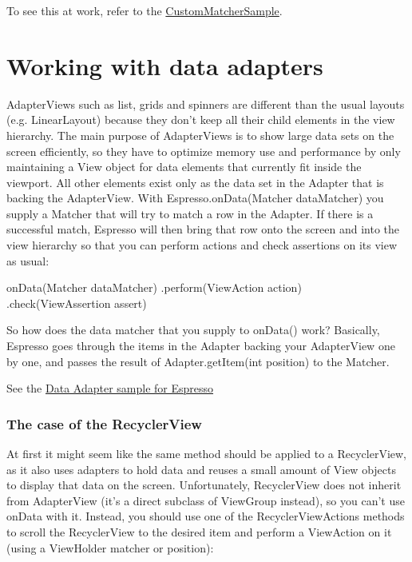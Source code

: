 To see this at work, refer to the \href{https://github.com/googlesamples/android-testing/tree/master/ui/espresso/CustomMatcherSample}{CustomMatcherSample}.

\section{Working with data adapters}
AdapterViews such as list, grids and spinners are different than the usual layouts (e.g. LinearLayout) because they don’t keep all their child elements in the view hierarchy. The main purpose of AdapterViews is to show large data sets on the screen efficiently, so they have to optimize memory use and performance by only maintaining a View object for data elements that currently fit inside the viewport.
All other elements exist only as the data set in the Adapter that is backing the AdapterView. With Espresso.onData(Matcher dataMatcher) you supply a Matcher that will try to match a row in the Adapter. If there is a successful match, Espresso will then bring that row onto the screen and into the view hierarchy so that you can perform actions and check assertions on its view as usual:

\begin{android}
onData(Matcher dataMatcher)
.perform(ViewAction action)
.check(ViewAssertion assert)
\end{android}


So how does the data matcher that you supply to onData() work? Basically, Espresso goes through the items in the Adapter backing your AdapterView one by one, and passes the result of Adapter.getItem(int position) to the Matcher.

See the \href{https://github.com/googlesamples/android-testing/tree/master/ui/espresso/DataAdapterSample}{Data Adapter sample for Espresso}

\subsubsection{The case of the RecyclerView}


At first it might seem like the same method should be applied to a RecyclerView, as it also uses adapters to hold data and reuses a small amount of View objects to display that data on the screen. Unfortunately, RecyclerView does not inherit from AdapterView (it’s a direct subclass of ViewGroup instead), so you can’t use onData with it.
Instead, you should use one of the RecyclerViewActions methods to scroll the RecyclerView to the desired item and perform a ViewAction on it (using a ViewHolder matcher or position):

